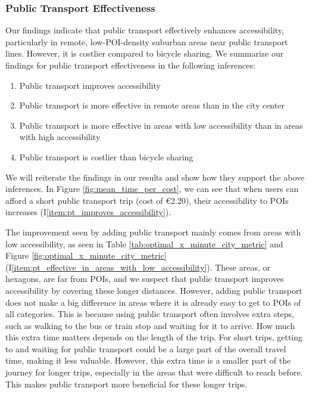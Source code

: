 \subsubsection{Public Transport Effectiveness}
Our findings indicate that public transport effectively enhances accessibility, particularly in remote, low-POI-density suburban areas near public transport lines. 
However, it is costlier compared to bicycle sharing.
We summarize our findings for public transport effectiveness in the following inferences:
\begin{enumerate}
  \renewcommand{\labelenumi}{I\theenumi.}
  \item Public transport improves accessibility \label{item:pt_improves_accessibility}
  \item Public transport is more effective in remote areas than in the city center \label{item:pt_effective_in_remote_areas}
  \item Public transport is more effective in areas with low accessibility than in areas with high accessibility  \label{item:pt_effective_in_areas_with_low_accessibility}
  \item Public transport is costlier than bicycle sharing \label{item:pt_costlier_than_bicycle_sharing}
\end{enumerate}
We will reiterate the findings in our results and show how they support the above inferences.
In Figure \ref{fig:mean_time_per_cost}, we can see that when users can afford a short public transport trip (cost of \euro{2.20}), their accessibility to POIs increases (I\ref{item:pt_improves_accessibility}).

The improvement seen by adding public transport mainly comes from areas with low accessibility, as seen in Table \ref{tab:optimal_x_minute_city_metric} and Figure \ref{fig:optimal_x_minute_city_metric} (I\ref{item:pt_effective_in_areas_with_low_accessibility}).
These areas, or hexagons, are far from POIs, and we suspect that public transport improves accessibility by covering these longer distances. 
However, adding public transport does not make a big difference in areas where it is already easy to get to POIs of all categories.
This is because using public transport often involves extra steps, such as walking to the bus or train stop and waiting for it to arrive. 
How much this extra time matters depends on the length of the trip.
For short trips, getting to and waiting for public transport could be a large part of the overall travel time, making it less valuable. 
However, this extra time is a smaller part of the journey for longer trips, especially in the areas that were difficult to reach before. 
This makes public transport more beneficial for these longer trips. 

